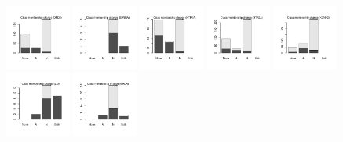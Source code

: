 \documentclass[utf8]{frontiersSCNS} %
\begin{document}
\begin{figure}[h!]
\includegraphics[width=0.19\textwidth]{figures/validation_plots/drd2_0p9_valplot.pdf}
\includegraphics[width=0.19\textwidth]{figures/validation_plots/ednra_0p9_valplot.pdf}
\includegraphics[width=0.19\textwidth]{figures/validation_plots/htr1a_0p9_valplot.pdf}
\includegraphics[width=0.19\textwidth]{figures/validation_plots/htr2a_0p9_valplot.pdf}
\includegraphics[width=0.19\textwidth]{figures/validation_plots/kcnh2_0p9_valplot.pdf}
\includegraphics[width=0.19\textwidth]{figures/validation_plots/lck_0p9_valplot.pdf}
\includegraphics[width=0.19\textwidth]{figures/validation_plots/maoa_0p9_valplot.pdf}

\end{figure}
\end{document}
